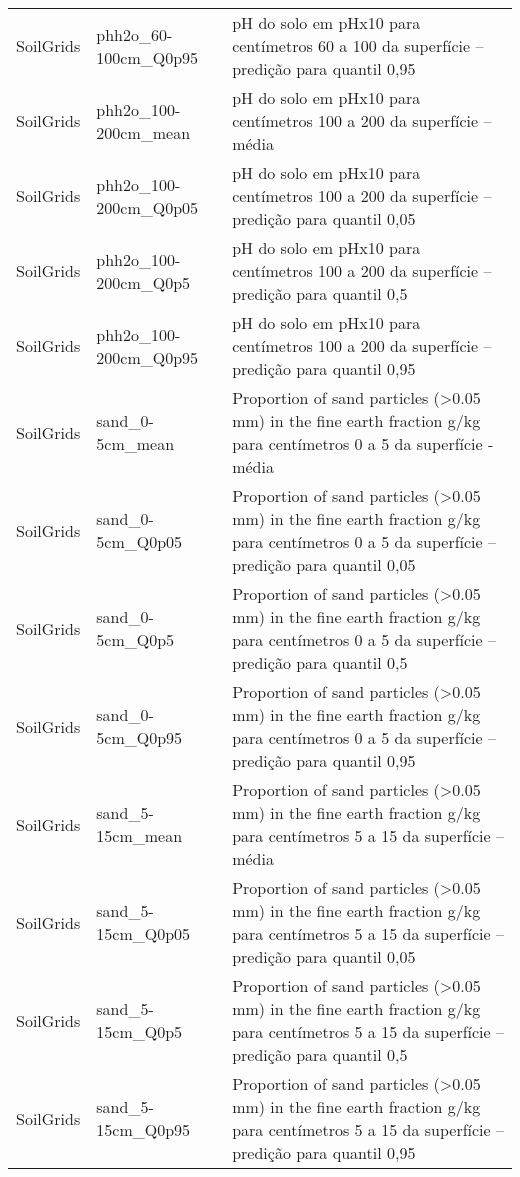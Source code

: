 \begin{longtable}{@{} p{4cm} p{4cm} p{8cm} @{}}
	SoilGrids &
	phh2o\_60-100cm\_Q0p95 &
	pH do solo em pHx10 para centímetros 60 a 100 da superfície – predição para quantil 0,95 \\
	SoilGrids &
	phh2o\_100-200cm\_mean &
	pH do solo em pHx10 para centímetros 100 a 200 da superfície – média \\
	SoilGrids &
	phh2o\_100-200cm\_Q0p05 &
	pH do solo em pHx10 para centímetros 100 a 200 da superfície – predição para quantil 0,05 \\
	SoilGrids &
	phh2o\_100-200cm\_Q0p5 &
	pH do solo em pHx10 para centímetros 100 a 200 da superfície – predição para quantil 0,5 \\
	SoilGrids &
	phh2o\_100-200cm\_Q0p95 &
	pH do solo em pHx10 para centímetros 100 a 200 da superfície – predição para quantil 0,95 \\
	SoilGrids &
	sand\_0-5cm\_mean &
	Proportion of sand particles (\textgreater 0.05 mm) in the fine earth fraction g/kg para centímetros 0 a 5 da superfície - média \\
	SoilGrids &
	sand\_0-5cm\_Q0p05 &
	Proportion of sand particles (\textgreater 0.05 mm) in the fine earth fraction g/kg para centímetros 0 a 5 da superfície – predição para quantil 0,05 \\
	SoilGrids &
	sand\_0-5cm\_Q0p5 &
	Proportion of sand particles (\textgreater 0.05 mm) in the fine earth fraction g/kg para centímetros 0 a 5 da superfície – predição para quantil 0,5 \\
	SoilGrids &
	sand\_0-5cm\_Q0p95 &
	Proportion of sand particles (\textgreater 0.05 mm) in the fine earth fraction g/kg para centímetros 0 a 5 da superfície – predição para quantil 0,95 \\
	SoilGrids &
	sand\_5-15cm\_mean &
	Proportion of sand particles (\textgreater 0.05 mm) in the fine earth fraction g/kg para centímetros 5 a 15 da superfície – média \\
	SoilGrids &
	sand\_5-15cm\_Q0p05 &
	Proportion of sand particles (\textgreater 0.05 mm) in the fine earth fraction g/kg para centímetros 5 a 15 da superfície – predição para quantil 0,05 \\
	SoilGrids &
	sand\_5-15cm\_Q0p5 &
	Proportion of sand particles (\textgreater 0.05 mm) in the fine earth fraction g/kg para centímetros 5 a 15 da superfície – predição para quantil 0,5 \\
	SoilGrids &
	sand\_5-15cm\_Q0p95 &
	Proportion of sand particles (\textgreater 0.05 mm) in the fine earth fraction g/kg para centímetros 5 a 15 da superfície – predição para quantil 0,95 \\

\end{longtable}
